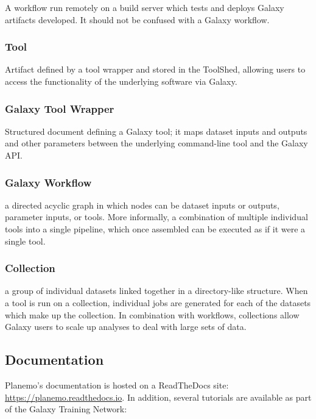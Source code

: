 A workflow run remotely on a build server which tests and deploys Galaxy
artifacts developed. It should not be confused with a Galaxy workflow.

\subsubsection*{Tool}

Artifact defined by a tool wrapper and stored in the ToolShed, allowing
users to access the functionality of the underlying software via Galaxy.

\subsubsection*{Galaxy Tool Wrapper}

Structured document defining a Galaxy tool; it maps dataset inputs and
outputs and other parameters between the underlying command-line tool
and the Galaxy API.

\subsubsection*{Galaxy Workflow}

a directed acyclic graph in which nodes can be dataset inputs or
outputs, parameter inputs, or tools. More informally, a combination of
multiple individual tools into a single pipeline, which once assembled
can be executed as if it were a single tool.

\subsubsection*{Collection}

a group of individual datasets linked together in a directory-like
structure. When a tool is run on a collection, individual jobs are
generated for each of the datasets which make up the collection. In
combination with workflows, collections allow Galaxy users to scale up
analyses to deal with large sets of data.


\subsection*{Documentation}

Planemo's documentation is hosted on a ReadTheDocs site:
\protect\hypertarget{ext-link-5}{\url{https://planemo.readthedocs.io}}.
In addition, several tutorials are available as part of the Galaxy
Training Network:

